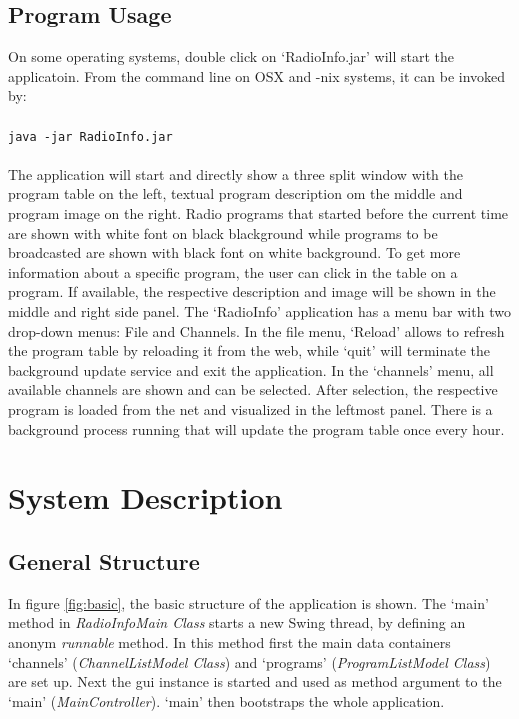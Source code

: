 \documentclass[a4paper,11pt,twoside]{article}
\begin{document}
\subsection{Program Usage}
On some operating systems, double click on `RadioInfo.jar' will start the applicatoin. From the command line on OSX and -nix systems, it can be invoked by: \\
\\
\verb+java -jar RadioInfo.jar+ \\
\\
The application will start and directly show a three split window with the program table on the left, textual program description om the middle and program image on the right.
Radio programs that started before the current time are shown with white font on black blackground while programs to be broadcasted are shown with black font on white background.
To get more information about a specific program, the user can click in the table on a program. If available, the respective description and image will be shown in the middle and right side panel.
The `RadioInfo' application has a menu bar with two drop-down menus: File and Channels. In the file menu, `Reload' allows to refresh the program table by reloading it from the web, while `quit' will terminate the background update service and exit the application. In the `channels' menu, all available channels are shown and can be selected. After selection, the respective program is loaded from the net and visualized in the leftmost panel.
There is a background process running that will update the program table once every hour. 


\section{System Description}

\subsection{General Structure}
In figure \ref{fig:basic}, the basic structure of the application is shown. The `main' method in \textit{RadioInfoMain Class} starts a new Swing thread, by defining an anonym \textit{runnable} method. In this method first the main data containers `channels' (\textit{ChannelListModel Class}) and `programs' (\textit{ProgramListModel Class}) are set up. Next the gui instance is started and used as method argument to the `main' (\textit{MainController}). `main' then bootstraps the whole application. 
\end{document}
